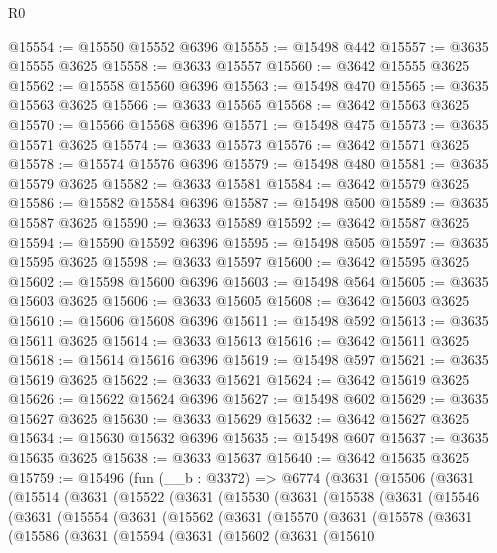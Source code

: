 \begin{lexlean}{R0}
\begin{coremodule}
@15554 := @15550 @15552 @6396
@15555 := @15498 @442
@15557 := @3635 @15555 @3625
@15558 := @3633 @15557
@15560 := @3642 @15555 @3625
@15562 := @15558 @15560 @6396
@15563 := @15498 @470
@15565 := @3635 @15563 @3625
@15566 := @3633 @15565
@15568 := @3642 @15563 @3625
@15570 := @15566 @15568 @6396
@15571 := @15498 @475
@15573 := @3635 @15571 @3625
@15574 := @3633 @15573
@15576 := @3642 @15571 @3625
@15578 := @15574 @15576 @6396
@15579 := @15498 @480
@15581 := @3635 @15579 @3625
@15582 := @3633 @15581
@15584 := @3642 @15579 @3625
@15586 := @15582 @15584 @6396
@15587 := @15498 @500
@15589 := @3635 @15587 @3625
@15590 := @3633 @15589
@15592 := @3642 @15587 @3625
@15594 := @15590 @15592 @6396
@15595 := @15498 @505
@15597 := @3635 @15595 @3625
@15598 := @3633 @15597
@15600 := @3642 @15595 @3625
@15602 := @15598 @15600 @6396
@15603 := @15498 @564
@15605 := @3635 @15603 @3625
@15606 := @3633 @15605
@15608 := @3642 @15603 @3625
@15610 := @15606 @15608 @6396
@15611 := @15498 @592
@15613 := @3635 @15611 @3625
@15614 := @3633 @15613
@15616 := @3642 @15611 @3625
@15618 := @15614 @15616 @6396
@15619 := @15498 @597
@15621 := @3635 @15619 @3625
@15622 := @3633 @15621
@15624 := @3642 @15619 @3625
@15626 := @15622 @15624 @6396
@15627 := @15498 @602
@15629 := @3635 @15627 @3625
@15630 := @3633 @15629
@15632 := @3642 @15627 @3625
@15634 := @15630 @15632 @6396
@15635 := @15498 @607
@15637 := @3635 @15635 @3625
@15638 := @3633 @15637
@15640 := @3642 @15635 @3625
@15759 := @15496
    (fun (__b : @3372) =>
    @6774
      (@3631
        (@15506
          (@3631
            (@15514
              (@3631
                (@15522
                  (@3631
                    (@15530
                      (@3631
                        (@15538
                          (@3631
                            (@15546
                              (@3631
                                (@15554
                                  (@3631
                                    (@15562
                                      (@3631
                                        (@15570
                                          (@3631
                                            (@15578
                                              (@3631
                                                (@15586
                                                  (@3631
                                                    (@15594
                                                      (@3631
                                                        (@15602
                                                          (@3631
                                                            (@15610

\end{coremodule}
\end{lexlean}
